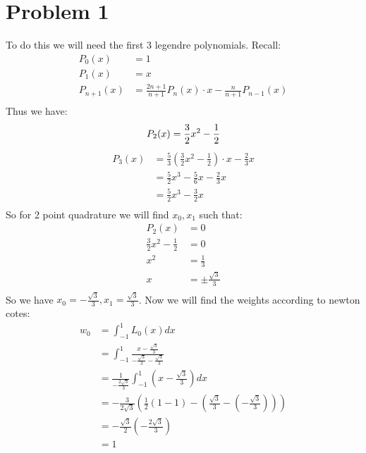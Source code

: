 \documentclass{article}
\title{\thetitle}
\author{\theauthor}
\begin{document}
\maketitle
\section* {Problem 1}
To do this we will need the first 3 legendre polynomials. Recall: \\
\begin{align*}
P_0(x) &= 1 \\
P_1(x) &= x \\
P_{n+1}(x) &= \frac{2n+1}{n+1}P_n(x) \cdot x - \frac{n}{n+1}P_{n-1}(x) \\
\end{align*}
Thus we have: \\
\[
P_2(x) = \frac{3}{2}x^2 - \frac{1}{2} \\
\]
\begin{align*}
P_3(x) &= \frac{5}{3}(\frac{3}{2}x^2 - \frac{1}{2})\cdot x- \frac{2}{3}x \\
&= \frac{5}{2}x^3 - \frac{5}{6}x - \frac{2}{3}x \\
&= \frac{5}{2}x^3 - \frac{3}{2}x \\
\end{align*}
So for 2 point quadrature we will find $x_0, x_1$ such that:\\
\begin{align*}
P_2(x) &= 0 \\
\frac{3}{2}x^2 - \frac{1}{2} &= 0 \\
x^2 &= \frac{1}{3} \\
x &=\pm \frac{\sqrt{3}}{3} \\
\end{align*}
So we have $x_0 = -\frac{\sqrt{3}}{3}, x_1 = \frac{\sqrt{3}}{3}$. Now we will find the weights according to newton cotes: \\
\begin{align*}
w_0 &= \int_{-1}^1L_0(x)dx \\
&= \int_{-1}^1\frac{x - \frac{\sqrt{3}}{3}}{-\frac{\sqrt{3}}{3} - \frac{\sqrt{3}}{3}} \\
&= \frac{1}{-\frac{2\sqrt{3}}{3}} \int_{-1}^1(x - \frac{\sqrt{3}}{3})dx \\
&= -\frac{3}{2 \sqrt{3}}(\frac{1}{2}(1 - 1) - (\frac{\sqrt{3}}{3} - (- \frac{\sqrt{3}}{3}))) \\
&= -\frac{\sqrt{3}}{2}( - \frac{2\sqrt{3}}{3})\\
&= 1
\end{align*}
\end{document}
